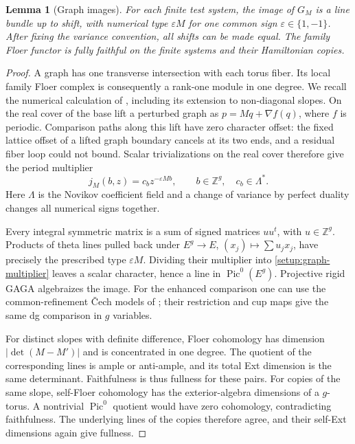 \documentclass[11pt]{article}
\numberwithin{equation}{section}
\newtheorem{lemma}[theorem]{Lemma}
\theoremstyle{definition}
\theoremstyle{remark}
\newcommand{\Z}{\mathbb Z}
\begin{document}
\begin{lemma}[Graph images]
\label{setup:graph-images}
For each finite test system, the image of $G_M$ is a line bundle up to
shift, with numerical type $\varepsilon M$ for one common sign
$\varepsilon\in\{1,-1\}$.  After fixing the variance convention, all
shifts can be made equal.  The family Floer functor is fully faithful
on the finite systems and their Hamiltonian copies.
\end{lemma}

\begin{proof}
A graph has one transverse intersection with each torus fiber.  Its
local family Floer complex is consequently a rank-one module in one
degree.  We recall the numerical calculation of
\cite[Lemma~9.1]{A8}, including its extension to non-diagonal slopes.
On the real cover of the base lift a perturbed graph as
$p=Mq+\nabla f(q)$, where $f$ is periodic.  Comparison paths along this
lift have zero character offset: the fixed lattice offset of a lifted
graph boundary cancels at its two ends, and a residual fiber loop could
not bound.  Scalar trivializations on the real cover therefore give
the period multiplier
\begin{equation}
 j_M(b,z)=c_bz^{-\varepsilon Mb},\qquad
 b\in\Z^g,\quad c_b\in\Lambda^*.
 \label{setup:graph-multiplier}
\end{equation}
Here $\Lambda$ is the Novikov coefficient field and a change of variance
by perfect duality changes all numerical signs together.

Every integral symmetric matrix is a sum of signed matrices $uu^t$,
with $u\in\Z^g$.  Products of theta lines pulled back under
$E^g\to E$, $(x_j)\mapsto\sum u_jx_j$, have precisely the prescribed
type $\varepsilon M$.  Dividing their multiplier into
\eqref{setup:graph-multiplier} leaves a scalar character, hence a line
in $\operatorname{Pic}^0(E^g)$.  Projective rigid GAGA algebraizes the
image.  For the enhanced comparison one can use the common-refinement
\v Cech models of \cite[Section~9]{A8}; their restriction and cup maps
give the same dg comparison in $g$ variables.

For distinct slopes with definite difference, Floer cohomology has
dimension $|\det(M-M')|$ and is concentrated in one degree.  The quotient
of the corresponding lines is ample or anti-ample, and its total Ext
dimension is the same determinant.  Faithfulness is thus fullness for
these pairs.  For copies of the same slope, self-Floer cohomology has
the exterior-algebra dimensions of a $g$-torus.  A nontrivial
$\operatorname{Pic}^0$ quotient would have zero cohomology, contradicting
faithfulness.  The underlying lines of the copies therefore agree, and
their self-Ext dimensions again give fullness.


\end{proof}
\end{document}
